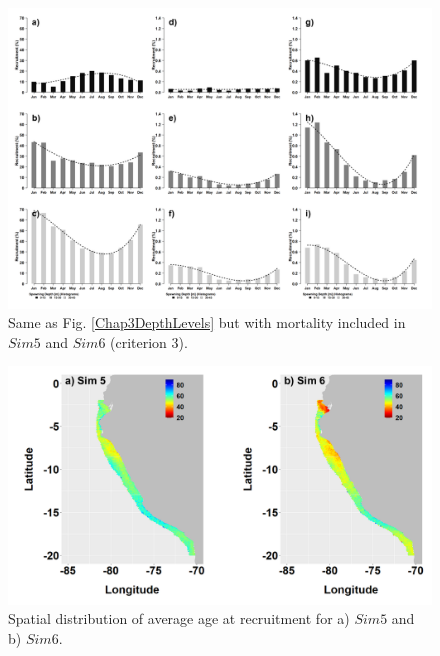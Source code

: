 \begin{figure}[H]
	\includegraphics[width=1.0\textwidth]{figures/Chap3DepthLevelsMortality.png}
	\centering
	\caption{Same as Fig. \ref{Chap3DepthLevels} but with mortality included in $Sim 5$ and $Sim 6$ (criterion 3).}
	\label{Chap3DepthLevelsMortality}
\end{figure}

\begin{figure}[H]
	\includegraphics[width=1.0\textwidth]{figures/Chap3MapAgeRecruSim5Sim6.png}
	\centering
	\caption{Spatial distribution of average age at recruitment for a) $Sim5$ and b) $Sim6$.}
	\label{Chap3MapAgeRecruSim5Sim6}
\end{figure}

